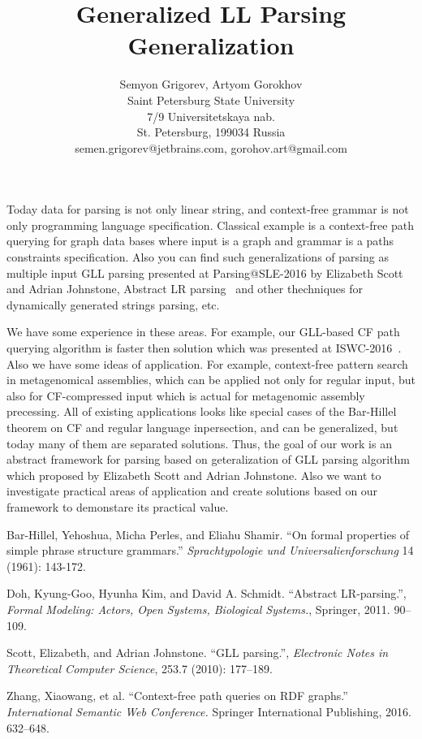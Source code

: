 \documentclass[12pt]{article}  %
\title{Generalized LL Parsing Generalization}
\author{Semyon Grigorev, Artyom Gorokhov
\\
       {Saint Petersburg State University}\\
       {7/9 Universitetskaya nab.}\\
       {St. Petersburg, 199034 Russia}\\
       semen.grigorev@jetbrains.com, gorohov.art@gmail.com
       }
\date{}
\theoremstyle{definition}
\theoremstyle{remark}
\begin{document}
\maketitle

Today data for parsing is not only linear string, and context-free grammar is not only programming language specification.
Classical example is a context-free path querying for graph data bases where input is a graph and grammar is a paths constraints specification.
Also you can find such generalizations of parsing as multiple input GLL parsing presented at Parsing@SLE-2016 by Elizabeth Scott and Adrian Johnstone, 
Abstract LR parsing~\cite{AbstractParsing} and other thechniques for dynamically generated strings parsing, etc.

We have some experience in these areas.
For example, our GLL-based CF path querying algorithm is faster then solution which was presented at ISWC-2016~\cite{CFRDFParsing}. 
Also we have some ideas of application.
For example, context-free pattern search in metagenomical assemblies, which can be applied not only for regular input, but also for CF-compressed input which is actual for metagenomic assembly precessing. 
All of existing applications looks like special cases of the Bar-Hillel~\cite{Bar-Hillel} theorem on CF and regular language inpersection, and can be generalized, but today many of them are separated solutions.
Thus, the goal of our work is an abstract framework for parsing based on geteralization of GLL parsing algorithm~\cite{GLL} which proposed by Elizabeth Scott and Adrian Johnstone. 
Also we want to investigate practical areas of application and create solutions based on our framework to demonstare its practical value.

\begin{thebibliography}{9}

  Bar-Hillel, Yehoshua, Micha Perles, and Eliahu Shamir.
  ``On formal properties of simple phrase structure grammars.''
   \emph{Sprachtypologie und Universalienforschung}
   14 (1961): 143-172.

  Doh, Kyung-Goo, Hyunha Kim, and David A. Schmidt.
  ``Abstract LR-parsing.'',
  \emph{Formal Modeling: Actors, Open Systems, Biological Systems.},
  Springer,
  2011.
  90--109.

  Scott, Elizabeth, and Adrian Johnstone.   
  ``GLL parsing.'',
  \emph{Electronic Notes in Theoretical Computer Science},
  253.7 (2010): 177--189.

  Zhang, Xiaowang, et al.
  ``Context-free path queries on RDF graphs.'' 
  \emph{International Semantic Web Conference.}
   Springer International Publishing, 2016.
   632--648.

\end{thebibliography}
\end{document}
